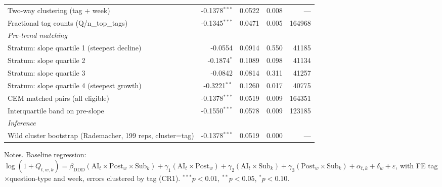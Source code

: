 \begin{table}[h]
\begin{tabular}{lrrrr}
  Two-way clustering (tag + week) & -0.1378$^{***}$ & 0.0522 & 0.008 & — \\
  Fractional tag counts (Q/n\_top\_tags) & -0.1345$^{***}$ & 0.0471 & 0.005 & 164968 \\
\midrule
\multicolumn{5}{l}{\textit{Pre-trend matching}} \\
  Stratum: slope quartile 1 (steepest decline) & -0.0554 & 0.0914 & 0.550 & 41185 \\
  Stratum: slope quartile 2 & -0.1874$^{*}$ & 0.1089 & 0.098 & 41134 \\
  Stratum: slope quartile 3 & -0.0842 & 0.0814 & 0.311 & 41257 \\
  Stratum: slope quartile 4 (steepest growth) & -0.3221$^{**}$ & 0.1260 & 0.017 & 40775 \\
  CEM matched pairs (all eligible) & -0.1378$^{***}$ & 0.0519 & 0.009 & 164351 \\
  Interquartile band on pre-slope & -0.1550$^{***}$ & 0.0578 & 0.009 & 123185 \\
\midrule
\multicolumn{5}{l}{\textit{Inference}} \\
  Wild cluster bootstrap (Rademacher, 199 reps, cluster=tag) & -0.1378$^{***}$ & 0.0519 & 0.000 & — \\
\bottomrule
\end{tabular}
\begin{minipage}{0.9\textwidth}
\footnotesize
Notes. Baseline regression: $\log(1+Q_{t,w,k}) = \beta_{\text{DDD}} (\text{AI}_t \times \text{Post}_w \times \text{Sub}_k) + \gamma_1 (\text{AI}_t \times \text{Post}_w) + \gamma_2 (\text{AI}_t \times \text{Sub}_k) + \gamma_3 (\text{Post}_w \times \text{Sub}_k) + \alpha_{t,k} + \delta_w + \varepsilon$, with FE tag$\times$question-type and week, errors clustered by tag (CR1). $^{***}p<0.01$, $^{**}p<0.05$, $^{*}p<0.10$.
\end{minipage}
\end{table}